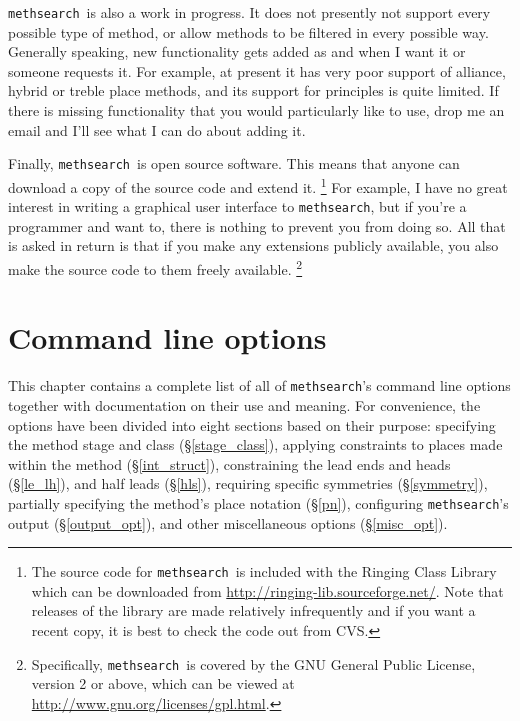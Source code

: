 \documentclass[a4paper,11pt,oneside]{book}
\def\methsearch{\texttt{meth\-search}}
\newcommand{\sref}[1]{\hyperref[#1]{\S\ref{#1}}}
\begin{document}
\methsearch\ is also a work in progress.  
It does not presently not support every possible type of method, 
or allow methods to be filtered in every possible way.
Generally speaking, new functionality gets added as and when I want it
or someone requests it.  For example, at present it has very poor support 
of alliance, hybrid or treble place methods,%
and its support for principles
is quite limited.
If there is missing functionality that you would particularly like to use, 
drop me an email and I'll see what I can do about adding it.

Finally, \methsearch\ is open source software.
This means that anyone 
can download a copy of the source code and extend it.%
\footnote{The source code for \methsearch\ is included with the 
Ringing Class Library which can be downloaded from 
\url{http://ringing-lib.sourceforge.net/}.  Note
that releases of the library are made relatively infrequently and if you
want a recent copy, it is best to check the code out from CVS.}
For example, I have no great interest in writing a graphical user interface 
to \methsearch, but if you're a programmer and want to, there is nothing to
prevent you from doing so.  All that is asked in return is that if you
make any extensions publicly available, you also make the source code to them
freely available.%
\footnote{Specifically, \methsearch\ is covered by the GNU General Public 
License, version 2 or above, which can be viewed at
\url{http://www.gnu.org/licenses/gpl.html}.}

\chapter{Command line options}

This chapter contains a complete list of all of \methsearch's command
line options together with documentation on their use and meaning.
For convenience, the options have been divided into eight sections based
on their purpose: specifying the method stage and class (\sref{stage_class}),
applying constraints to places made within the method (\sref{int_struct}),
constraining the lead ends and heads (\sref{le_lh}), and half leads 
(\sref{hls}), requiring specific symmetries (\sref{symmetry}),
partially specifying the method's place notation (\sref{pn}),
configuring \methsearch's output (\sref{output_opt}), and other 
miscellaneous options (\sref{misc_opt}).
\end{document}
